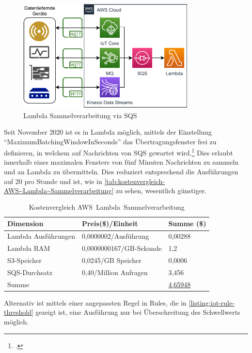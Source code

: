 \begin{figure}[H]
\centering
\includegraphics[width=0.8\textwidth]{graphics/Lambda-Batch.pdf}
\caption{Lambda Sammelverarbeitung via SQS}
\label{abb:Lambda-Batch}
\end{figure}

Seit November 2020 ist es in Lambda möglich, mittels der Einstellung \enquote{MaximumBatchingWindowInSeconds} das Übertragungsfenster frei zu definieren, in welchem auf Nachrichten von \ac{SQS} gewartet wird.\footcite[Vgl. auch im Folgenden][]{AmazonWebServicesInc..2020b} Dies erlaubt innerhalb eines maximalen Fensters von fünf Minuten Nachrichten zu sammeln und an Lambda zu übermitteln. Dies reduziert entsprechend die Ausführungen auf 20 pro Stunde und ist, wie in \autoref{tab:kostenvergleich-AWS~Lambda~Sammelverarbeitung} zu sehen, wesentlich günstiger.

\begin{table}[H]
\centering
\begin{tabular}{|l|l|l|}
\hline
Dimension & Preis(\$)/Einheit & Summe (\$) \\ \hline
Lambda Ausführungen & 0,0000002/Ausführung & 0,00288 \\ \hline
Lambda \ac{RAM} & 0,0000000167/GB-Sekunde & 1,2 \\ \hline
\ac{S3}-Speicher & 0,0245/GB Speicher & 0,0006 \\ \hline
\ac{SQS}-Durchsatz & 0,40/Million Anfragen & 3,456 \\\hline
Summe & \cellcolor[HTML]{EFEFEF} & \underline{4,65948} \\ \hline
\end{tabular}
\caption{Kostenvergleich AWS~Lambda~Sammelverarbeitung}
\label{tab:kostenvergleich-AWS~Lambda~Sammelverarbeitung}
\end{table}


Alternativ ist mittels einer angepassten Regel in \AWSIOT{} Rules, die in \autoref{listing:iot-rule-threshold} gezeigt ist, eine Ausführung nur bei Überschreitung des Schwellwerts möglich.

